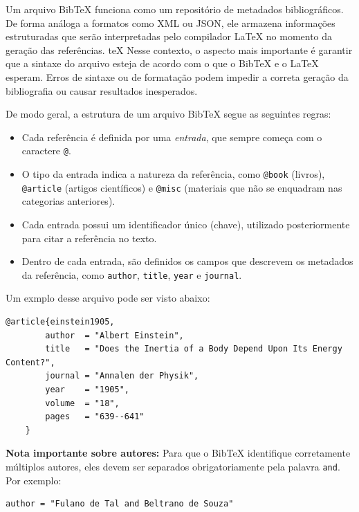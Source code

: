 \documentclass{article}
\begin{document}
Um arquivo BibTeX funciona como um repositório de metadados bibliográficos. De forma análoga a formatos como XML ou JSON, ele armazena informações estruturadas que serão interpretadas pelo compilador \LaTeX\hspace{1pt} no momento da geração das referências.
teX
Nesse contexto, o aspecto mais importante é garantir que a sintaxe do arquivo esteja de acordo com o que o BibTeX e o \LaTeX\hspace{1pt} esperam. Erros de sintaxe ou de formatação podem impedir a correta geração da bibliografia ou causar resultados inesperados.

De modo geral, a estrutura de um arquivo BibTeX segue as seguintes regras:

\begin{itemize}
	\item Cada referência é definida por uma \textit{entrada}, que sempre começa com o caractere \texttt{@}.
	\item O tipo da entrada indica a natureza da referência, como \texttt{@book} (livros), \texttt{@article} (artigos científicos) e \texttt{@misc} (materiais que não se enquadram nas categorias anteriores).
	\item Cada entrada possui um identificador único (chave), utilizado posteriormente para citar a referência no texto.
	\item Dentro de cada entrada, são definidos os campos que descrevem os metadados da referência, como \texttt{author}, \texttt{title}, \texttt{year} e \texttt{journal}.
\end{itemize}

Um exmplo desse arquivo pode ser visto abaixo:

\begin{lstlisting}[style=bibtex]
	@article{einstein1905,
		author  = "Albert Einstein",
		title   = "Does the Inertia of a Body Depend Upon Its Energy Content?",
		journal = "Annalen der Physik",
		year    = "1905",
		volume  = "18",
		pages   = "639--641"
	}
\end{lstlisting}

\textbf{Nota importante sobre autores:}  
Para que o BibTeX identifique corretamente múltiplos autores, eles devem ser separados obrigatoriamente pela palavra \texttt{and}. Por exemplo:

\begin{lstlisting}[style=bibtex]
	author = "Fulano de Tal and Beltrano de Souza"
\end{lstlisting}
\end{document}
